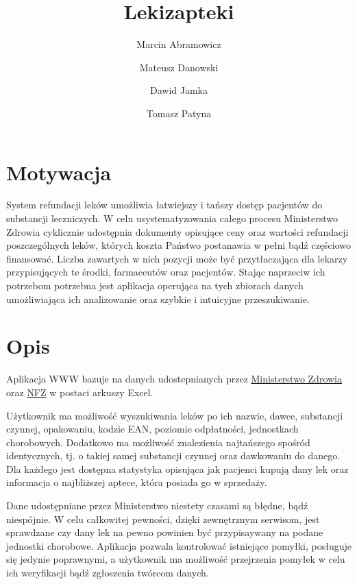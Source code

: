 \documentclass{article}
\title{Lekizapteki}
\author{Marcin Abramowicz \and Mateusz Danowski \and Dawid Jamka \and Tomasz Patyna}
\begin{document}
\maketitle


\section{Motywacja}

System refundacji leków umożliwia łatwiejszy i tańszy dostęp pacjentów do substancji leczniczych. W celu usystematyzowania całego procesu Ministerstwo Zdrowia cyklicznie udostępnia dokumenty opisujące ceny oraz wartości refundacji poszczególnych leków, których koszta Państwo postanawia w pełni bądź częściowo finansować. Liczba zawartych w nich pozycji może być przytłaczająca dla lekarzy przypisujących te środki, farmaceutów oraz pacjentów. Stając naprzeciw ich potrzebom potrzebna jest aplikacja operująca na tych zbiorach danych umożliwiająca ich analizowanie oraz szybkie i intuicyjne przeszukiwanie.


\section{Opis}

Aplikacja WWW bazuje na danych udostepnianych przez
\href{https://www.gov.pl/web/zdrowie/obwieszczenia-ministra-zdrowia-lista-lekow-refundowanych?fbclid=IwAR1U3YB3yON5EN2s1qdYRbcIeh7iDxqeOtQoEYGFvX9ozGDWdURIK2JOMRs}
{Ministerstwo Zdrowia}
oraz \href{https://www.nfz.gov.pl/aktualnosci/aktualnosci-centrali/komunikat-dgl,7465.html?fbclid=IwAR0F41XjLwTg7XQdUjeYpE_KS4VVZk50etlbYDpwxhxOR2ZLdslMatUtbEU}{NFZ}
w postaci arkuszy Excel.

Użytkownik ma możliwość wyszukiwania leków po ich nazwie, dawce, substancji czynnej, opakowaniu, kodzie EAN, poziomie odpłatności, jednostkach chorobowych. Dodatkowo ma możliwość znalezienia najtańszego spośród identycznych, tj. o takiej samej substancji czynnej oraz dawkowaniu do danego. Dla każdego jest dostępna statystyka opisująca jak pacjenci kupują dany lek oraz informacja o najbliższej aptece, która posiada go w sprzedaży. 

Dane udostępniane przez Ministerstwo niestety czasami są błędne, bądź niespójnie. W celu całkowitej pewności, dzięki zewnętrznym serwisom, jest sprawdzane czy dany lek na pewno powinien być przypisaywany na podane jednostki chorobowe. Aplikacja pozwala kontrolować istniejące pomyłki, posługuje się jedynie poprawnymi, a użytkownik ma możliwość przejrzenia pomyłek w celu ich weryfikacji bądź zgłoszenia twórcom danych.
\end{document}
